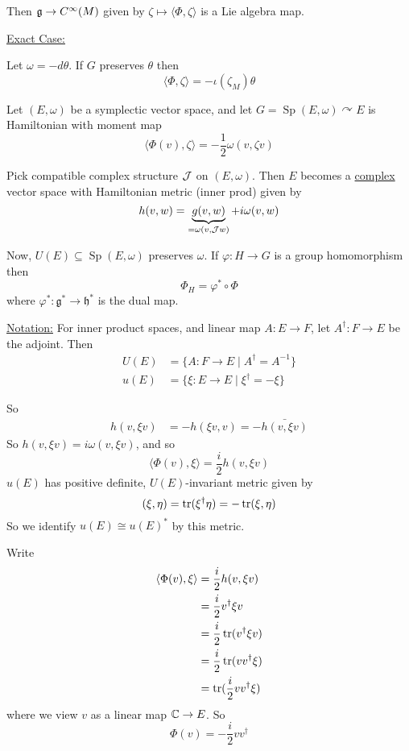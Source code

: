 \documentclass[x11names,reqno,14pt]{extarticle}
\newcommand{\mk}[1]{\mathfrak{#1}}
\newcommand{\g}{\mk{g}}
\newcommand{\h}{\mk{h}}
\newcommand{\J}{\mc{J}}
\newcommand{\spew}{\Sp(E,\omega)}
\DeclareMathOperator{\Sp}{Sp}
\begin{document}
Then $\g \to C^\oo(M)$ given by $\zeta \mapsto \langle\Phi,\zeta\rangle$ is a Lie algebra map. 

\underline{Exact Case:}

Let $\omega = -d\theta$. If $G$ preserves $\theta$ then 
\[
\langle\Phi,\zeta\rangle = -\iota(\zeta_M)\theta
\]

\exm

Let $(E,\omega)$ be a symplectic vector space, and let $G = \spew\curvearrowright E$ is Hamiltonian with moment map 
\[
\langle\Phi(v),\zeta\rangle = -\frac12\omega(v,\zeta v)
\]

\exm

Pick compatible complex structure $\J$ on $(E,\omega)$. Then $E$ becomes a \underline{complex} vector space with Hamiltonian metric  (inner prod) given by 
\[
h(v,w) = \underbrace{g(v,w)}_{=\omega(v,\J w)} + i\omega(v,w)
\]

Now, $U(E) \subseteq\spew$ preserves $\omega$. If $\varphi:H\to G$  is a group homomorphism then 
\[
\Phi_H = \varphi^*\circ\Phi
\]
where $\varphi^*:\g^*\to\h^*$ is the dual map.

\underline{Notation:} For inner product spaces, and linear map $A:E\to F$, let $A^\dagger:F\to E$ be the adjoint. Then 
\begin{align*}
U(E) & = \{A:F\to E \mid A^\dagger = A^{-1}\} \\
u(E) & = \{\xi:E\to E \mid \xi^\dagger = -\xi\}
\end{align*}

So 
\begin{align*}
h(v,\xi v) & = -h(\xi v, v) = - \bar{h(v,\xi v)}
\end{align*}
So $h(v,\xi v) = i\omega(v,\xi v)$, and so 
\[
\langle\Phi(v),\xi\rangle = \frac{i}{2}h(v,\xi v)
\]
$u(E)$ has positive definite, $U(E)$-invariant metric given by 
\[
(\xi,\eta) = \operatorname{\mathrm{tr}}(\xi^\dagger\eta) = -\operatorname{\mathrm{tr}}(\xi,\eta)
\]
So we identify $u(E)\cong u(E)^*$ by this metric. 

Write 
\begin{align*}
\langle\Phi(v),\xi\rangle & = \frac{i}{2}h(v,\xi v) \\
& = \frac{i}{2} v^\dagger\xi v \\
& = \frac{i}{2}\operatorname{\mathrm{tr}}(v^\dagger\xi v) \\
& = \frac{i}{2}\operatorname{\mathrm{tr}}(vv^\dagger \xi) \\
& = \operatorname{\mathrm{tr}}(\frac{i}{2}vv^\dagger\xi)
\end{align*}
where we view $v$ as a linear map $\mathbb{C}\to E$. So 
\[
\Phi(v) = -\frac{i}{2}vv^\dagger
\]
\end{document}
